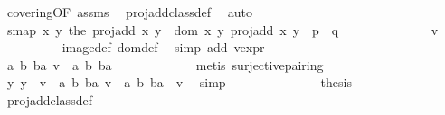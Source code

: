 \begin{isabellebody}
\ covering{\isacharbrackleft}OF\ assms{\isacharbrackright}\ \isamarkupfalse%
\ proj{\isacharunderscore}add{\isacharunderscore}class{\isacharunderscore}def\ \isamarkupfalse%
\ auto\isanewline
\ \ \ \ \ \ \isamarkupfalse%
\ s{\isacharunderscore}map{\isacharcolon}\ {\isachardoublequoteopen}{\isacharparenleft}{\isasymlambda}{\isacharparenleft}x{\isacharcomma}\ y{\isacharparenright}{\isachardot}\ the\ {\isacharparenleft}proj{\isacharunderscore}add\ x\ y{\isacharparenright}{\isacharparenright}\ {\isacharbackquote}\ {\isacharparenleft}dom\ {\isacharparenleft}{\isasymlambda}{\isacharparenleft}x{\isacharcomma}\ y{\isacharparenright}{\isachardot}\ proj{\isacharunderscore}add\ x\ y{\isacharparenright}\ {\isasyminter}\ p\ {\isasymtimes}\ q{\isacharparenright}\ {\isacharequal}\ \isanewline
\ \ \ \ \ \ \ \ \ \ \ \ {\isacharbraceleft}v{\isacharbraceright}{\isachardoublequoteclose}\isanewline
\ \ \ \ \ \ \ \ \isamarkupfalse%
\ image{\isacharunderscore}def\ dom{\isacharunderscore}def\ {}\ \isamarkupfalse%
{\isacharparenleft}simp\ add{\isacharcolon}\ v{\isacharunderscore}expr{\isacharparenright}\isanewline
\ \ \ \ \ \ \isamarkupfalse%
\ {\isacharminus}\isanewline
\ \ \ \ \ \ \ \ \isamarkupfalse%
\ {\isachardoublequoteopen}{\isacharparenleft}{\isasymexists}a\ b\ ba{\isachardot}\ v\ {\isacharequal}\ {\isacharparenleft}{\isacharparenleft}a{\isacharcomma}\ b{\isacharparenright}{\isacharcomma}\ ba{\isacharparenright}{\isacharparenright}{\isachardoublequoteclose}\ \isanewline
\ \ \ \ \ \ \ \ \ \ \isamarkupfalse%
\ {\isacharparenleft}metis\ surjective{\isacharunderscore}pairing{\isacharparenright}\isanewline
\ \ \ \ \ \ \ \ \isamarkupfalse%
\ \isamarkupfalse%
\ {\isachardoublequoteopen}{\isacharbraceleft}y{\isachardot}\ y\ {\isacharequal}\ v\ {\isasymand}\ {\isacharparenleft}{\isasymexists}a\ b\ ba{\isachardot}\ v\ {\isacharequal}\ {\isacharparenleft}{\isacharparenleft}a{\isacharcomma}\ b{\isacharparenright}{\isacharcomma}\ ba{\isacharparenright}{\isacharparenright}{\isacharbraceright}\ {\isacharequal}\ {\isacharbraceleft}v{\isacharbraceright}{\isachardoublequoteclose}\ \isamarkupfalse%
\ simp\isanewline
\ \ \ \ \ \ \isamarkupfalse%
\isanewline
\ \ \ \ \ \ \isamarkupfalse%
\ {\isacharquery}thesis\ \isanewline
\ \ \ \ \ \ \ \ \isamarkupfalse%
\ proj{\isacharunderscore}add{\isacharunderscore}class{\isacharunderscore}def\ \isamarkupfalse%

\end{isabellebody}
